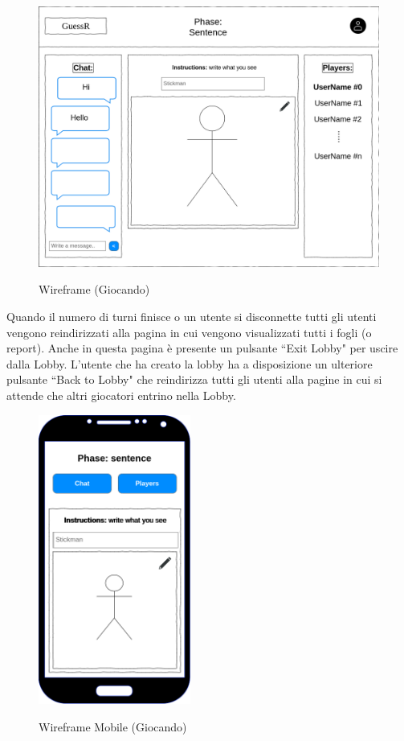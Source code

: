 \begin{figure}[H]
    \caption{Wireframe (Giocando)}
    \centering
    \includegraphics[width=150mm]{img/ingSoft/wireframeInGame.png}
    \label{fig:playing_wireframe}
\end{figure}

\noindent Quando il numero di turni finisce o un utente si disconnette tutti gli utenti vengono reindirizzati alla pagina in cui vengono visualizzati tutti i fogli (o report). Anche in questa pagina è presente un pulsante ``Exit Lobby" per uscire dalla Lobby. L'utente che ha creato la lobby ha a disposizione un ulteriore pulsante ``Back to Lobby" che reindirizza tutti gli utenti alla pagine in cui si attende che altri giocatori entrino nella Lobby.

\begin{figure}[H]
    \caption{Wireframe Mobile (Giocando)}
    \centering
    \includegraphics[width=50mm]{img/ingSoft/wireframeMobileInGame.png}
    \label{fig:playing_mobile_wireframe}
\end{figure}

